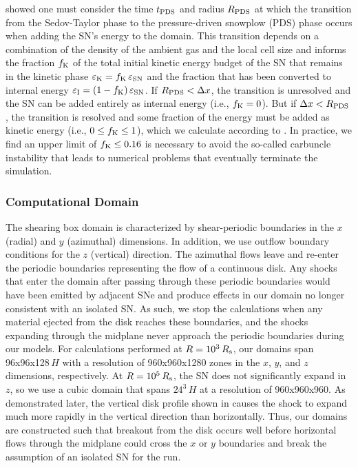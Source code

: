 \citet{Simpson+15} showed one must consider the time $t_{\rm PDS}$ and radius $R_{\rm PDS}$ at which the transition from the Sedov-Taylor phase to the pressure-driven snowplow (PDS) phase occurs when adding the SN's energy to the domain.
This transition depends on a combination of the density of the ambient gas and the local cell size and informs the fraction $f_{\rm K}$ of the total initial kinetic energy budget of the SN that remains in the kinetic phase $\varepsilon_{\rm K} = f_{\rm K}\,\varepsilon_{\rm SN}$ and the fraction that has been converted to internal energy $\varepsilon_{\rm I} = (1-f_{\rm K})\,\varepsilon_{\rm SN}$.
If $R_{\rm PDS} < \Delta x$, the transition is unresolved and the SN can be added entirely as internal energy (i.e., $f_{\rm K} = 0$).
But if $\Delta x < R_{\rm PDS}$, the transition is resolved and some fraction of the energy must be added as kinetic energy (i.e., $0\leq f_{\rm K}\leq1$), which we calculate according to \citet{Simpson+15}.
In practice, we find an upper limit of $f_{\rm K} \leq 0.16$ is necessary to avoid the so-called carbuncle instability \citep{PeeryImlay88, Robinet+00} that leads to numerical problems that eventually terminate the simulation.


\subsubsection{Computational Domain} \label{sec:HydroDomains}

The shearing box domain is characterized by shear-periodic boundaries in the $x$ (radial) and $y$ (azimuthal) dimensions.
In addition, we use outflow boundary conditions for the $z$ (vertical) direction.
The azimuthal flows leave and re-enter the periodic boundaries representing the flow of a continuous disk.
Any shocks that enter the domain after passing through these periodic boundaries would have been emitted by adjacent SNe and produce effects in our domain no longer consistent with an isolated SN.
As such, we stop the calculations when any material ejected from the disk reaches these boundaries, and the shocks expanding through the midplane never approach the periodic boundaries during our models.
For calculations performed at $R=10^3\,R_{\rm s}$, our domains span 96x96x128$\,H$ with a resolution of 960x960x1280 zones in the $x$, $y$, and $z$ dimensions, respectively.
At $R=10^5\,R_{\rm s}$, the SN does not significantly expand in $z$, so we use a cubic domain that spans $24^3\,H$ at a resolution of 960x960x960.
As demonstrated later, the vertical disk profile shown in  causes the shock to expand much more rapidly in the vertical direction than horizontally.
Thus, our domains are constructed such that breakout from the disk occurs well before horizontal flows through the midplane could cross the $x$ or $y$ boundaries and break the assumption of an isolated SN for the run.



